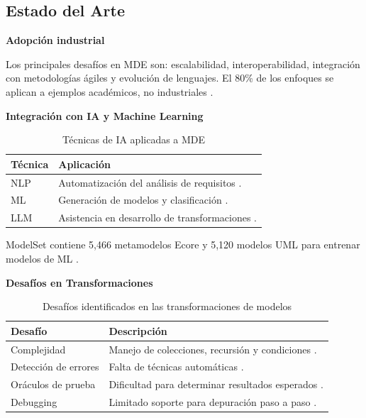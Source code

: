 \documentclass[journal,onecolumn]{IEEEtran}
\begin{document}
\subsection{Estado del Arte}

\textbf{Adopción industrial}

Los principales desafíos en MDE son: escalabilidad, interoperabilidad, integración con metodologías ágiles y evolución de lenguajes. El 80\% de los enfoques se aplican a ejemplos académicos, no industriales \cite{Bucchiarone2020}.

\textbf{Integración con IA y Machine Learning}

\begin{table}[H]
	\centering
	\caption{Técnicas de IA aplicadas a MDE}
	\label{tab:ia-tecnicas}
	\begin{tabular}{|l|p{8cm}|}
		\hline
		\textbf{Técnica} & \textbf{Aplicación} \\
		\hline
		NLP & Automatización del análisis de requisitos \cite{Zammel2025}. \\
		\hline
		ML & Generación de modelos y clasificación \cite{Zammel2025}. \\
		\hline
		LLM & Asistencia en desarrollo de transformaciones \cite{Zammel2025}. \\
		\hline
	\end{tabular}
\end{table}

ModelSet contiene 5,466 metamodelos Ecore y 5,120 modelos UML para entrenar modelos de ML \cite{Zammel2025}.

\textbf{Desafíos en Transformaciones}

\begin{table}[H]
	\centering
	\caption{Desafíos identificados en las transformaciones de modelos}
	\label{tab:desafios-transformaciones}
	\begin{tabular}{|l|p{8cm}|}
		\hline
		\textbf{Desafío} & \textbf{Descripción} \\
		\hline
		Complejidad & Manejo de colecciones, recursión y condiciones \cite{Lopez2022}. \\
		\hline
		Detección de errores & Falta de técnicas automáticas \cite{Lopez2022}. \\
		\hline
		Oráculos de prueba & Dificultad para determinar resultados esperados \cite{Lopez2022}. \\
		\hline
		Debugging & Limitado soporte para depuración paso a paso \cite{Lopez2022}. \\
		\hline
	\end{tabular}
\end{table}
\end{document}
